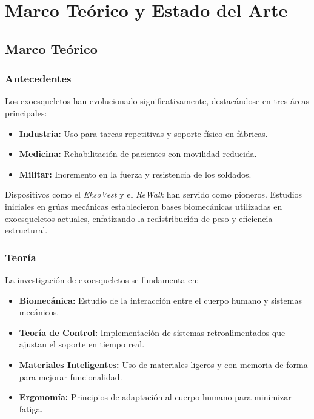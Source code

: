 \chapter{Marco Teórico y Estado del Arte}

\section{Marco Teórico}

\subsection{Antecedentes}
Los exoesqueletos han evolucionado significativamente, destacándose en tres áreas principales:
\begin{itemize}
    \item \textbf{Industria:} Uso para tareas repetitivas y soporte físico en fábricas.
    \item \textbf{Medicina:} Rehabilitación de pacientes con movilidad reducida.
    \item \textbf{Militar:} Incremento en la fuerza y resistencia de los soldados.
\end{itemize}

Dispositivos como el \textit{EksoVest} y el \textit{ReWalk} han servido como pioneros. Estudios iniciales en grúas mecánicas establecieron bases biomecánicas utilizadas en exoesqueletos actuales, enfatizando la redistribución de peso y eficiencia estructural.

\subsection{Teoría}
La investigación de exoesqueletos se fundamenta en:
\begin{itemize}
    \item \textbf{Biomecánica:} Estudio de la interacción entre el cuerpo humano y sistemas mecánicos.
    \item \textbf{Teoría de Control:} Implementación de sistemas retroalimentados que ajustan el soporte en tiempo real.
    \item \textbf{Materiales Inteligentes:} Uso de materiales ligeros y con memoria de forma para mejorar funcionalidad.
    \item \textbf{Ergonomía:} Principios de adaptación al cuerpo humano para minimizar fatiga.
\end{itemize}

